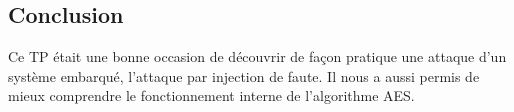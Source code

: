 
\subsection{Conclusion}
Ce TP était une bonne occasion de découvrir de façon pratique une attaque
d'un système embarqué, l'attaque par injection de faute.
Il nous a aussi permis de mieux comprendre le fonctionnement interne de
l'algorithme AES.
